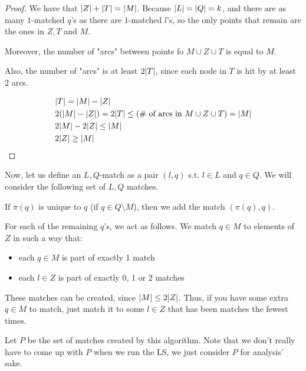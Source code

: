     \begin{proof}
        We have that $\vert Z \vert + \vert T \vert = \vert M \vert$.
        Because $\vert L \vert = \vert Q \vert = k$, and there are as many $1$-matched $q$'s as there are $1$-matched $l$'s, so the only points that remain are the ones in $Z, T$ and $M$.

        Moreover, the number of "arcs" between points fo $M \cup Z \cup T$ is equal to $M$.

        Also, the number of "arcs" is at least $2 \vert T \vert$, since each node in $T$ is hit by at least $2$ arcs.

        \begin{equation*}
            \begin{split}
                &\vert T \vert = \vert M \vert - \vert Z \vert\\
                &2 (\vert M \vert - \vert Z \vert) = 2 \vert T \vert \leq (\text{\# of arcs in } M \cup Z \cup T) = \vert M \vert\\
                &2 \vert M \vert - 2 \vert Z \vert \leq \vert M \vert\\
                &2 \vert Z \vert \geq \vert M \vert
            \end{split}
        \end{equation*}
    \end{proof}

    Now, let us define an $L,Q$-match as a pair $(l,q)$ s.t. $l \in L$ and $q \in Q$.
    We will consider the following set of $L,Q$ matches.

    If $\pi(q)$ is unique to $q$ (if $q \in Q \setminus M$), then we add the match $(\pi(q), q)$.

    For each of the remaining $q$'s, we act as follows.
    We match $q \in M$ to elements of $Z$ in such a way that:
    \begin{itemize}
        \item each $q \in M$ is part of exactly 1 match
        \item each $l \in Z$ is part of exactly 0, 1 or 2 matches
    \end{itemize}

    These matches can be created, since $\vert M \vert \leq 2 \vert Z \vert$.
    Thus, if you have some extra $q \in M$ to match, just match it to some $l \in Z$ that has been matches the fewest times.

    Let $P$ be the set of matches created by this algorithm.
    Note that we don't really have to come up with $P$ when we run the LS, we just consider $P$ for analysis' sake.


